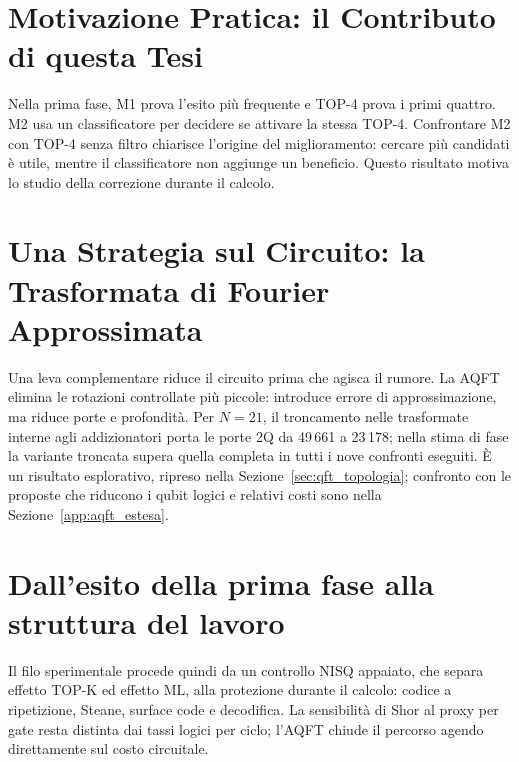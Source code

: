 \begin{onehalfspace}
\section{Motivazione Pratica: il Contributo di questa Tesi}
\label{sec:motivazione_ml}

Nella prima fase, M1 prova l'esito più frequente e TOP-4 prova i primi quattro. M2 usa un classificatore per decidere se attivare la stessa TOP-4. Confrontare M2 con TOP-4 senza filtro chiarisce l'origine del miglioramento: cercare più candidati è utile, mentre il classificatore non aggiunge un beneficio. Questo risultato motiva lo studio della correzione durante il calcolo.

\section{Una Strategia sul Circuito: la Trasformata di Fourier Approssimata}
\label{sec:aqft_strategia}

Una leva complementare riduce il circuito prima che agisca il rumore. La
\ac{AQFT} elimina le rotazioni controllate più piccole: introduce errore di
approssimazione, ma riduce porte e profondità. Per $N=21$, il troncamento nelle
trasformate interne agli addizionatori porta le porte 2Q da 49\,661 a 23\,178;
nella stima di fase la variante troncata supera quella completa in tutti i nove
confronti eseguiti. È un risultato esplorativo, ripreso nella
Sezione~\ref{sec:qft_topologia}; confronto con le proposte che riducono i qubit
logici e relativi costi sono nella Sezione~\ref{app:aqft_estesa}.

\section{Dall'esito della prima fase alla struttura del lavoro}

Il filo sperimentale procede quindi da un controllo NISQ appaiato, che separa
effetto TOP-K ed effetto ML, alla protezione durante il calcolo: codice a
ripetizione, Steane, surface code e decodifica. La sensibilità di Shor al proxy
per gate resta distinta dai tassi logici per ciclo; l'\ac{AQFT} chiude il
percorso agendo direttamente sul costo circuitale.

\end{onehalfspace}
